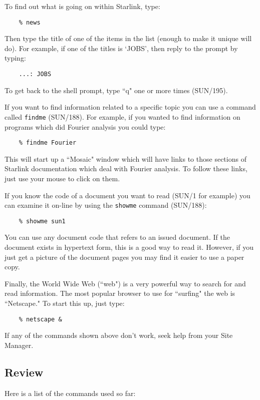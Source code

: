 \documentclass[twoside,11pt]{article}
\newcommand{\xref}[3]{#1}
\begin{document}
To find out what is going on within Starlink, type:
\begin{verbatim}
    % news
\end{verbatim}
Then type the title of one of the items in the list (enough to make it
unique will do).
For example, if one of the titles is `JOBS', then reply to the prompt
by typing:
\begin{verbatim}
    ...: JOBS
\end{verbatim}
To get back to the shell prompt, type ``q" one or more times
(\xref{SUN/195}{sun195}{}).

If you want to find information related to a specific topic you can use a
command called {\tt findme} (\xref{SUN/188}{sun188}{}).
For example, if you wanted to find information on programs which did
Fourier analysis you could type:
\begin{verbatim}
    % findme Fourier
\end{verbatim}
This will start up a ``Mosaic" window which will have links to those sections
of Starlink documentation which deal with Fourier analysis.
To follow these links, just use your mouse to click on them.

If you know the code of a document you want to read
(\xref{SUN/1}{sun1}{} for example)
you can examine it on-line by using the {\tt showme} command
(\xref{SUN/188}{sun188}{}):
\begin{verbatim}
    % showme sun1
\end{verbatim}
You can use any document code that refers to an issued document.
If the document exists in hypertext form, this is a good way to read it.
However, if you just get a picture of the document pages you may find it
easier to use a paper copy.

Finally, the World Wide Web (``web") is a very powerful way to search for and
read information.
The most popular browser to use for ``surfing" the web is ``Netscape."
To start this up, just type:
\begin{verbatim}
    % netscape &
\end{verbatim}
If any of the commands shown above don't work, seek help from your Site
Manager.

\newpage

\subsection{Review}

Here is a list of the commands used so far:
\end{document}
